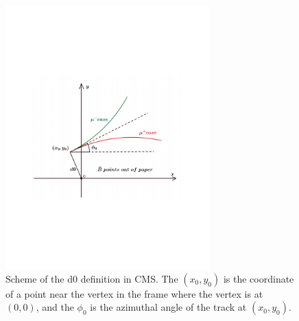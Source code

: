 \begin{figure}[!htb]
      \centering
      \captionsetup{justification=justified}
      \includegraphics[width=0.70\textwidth]{pics/muon_corr/GeoFit/d0_def.pdf}
      \caption{Scheme of the d0 definition in CMS. The $(x_{0}, y_{0})$ is the coordinate of 
               a point near the vertex in the frame where the vertex is at $(0,0)$, 
               and the $\phi_{0}$ is the azimuthal angle of the track at $(x_{0}, y_{0})$.}
      \label{fig:d0_def}
\end{figure}

